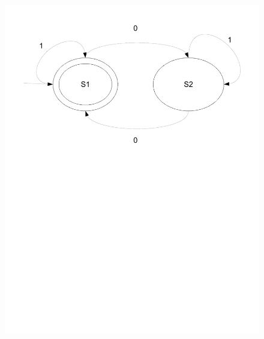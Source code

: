 \begin{figure}[htp]
    \centering
    \includegraphics[trim= 10mm 150mm 10mm 10mm, clip ,width=\imgmedsmall]{./images/state_moore.pdf} 

\end{figure}

